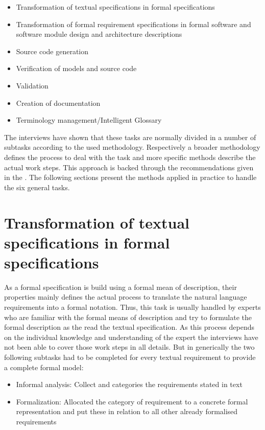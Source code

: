 \documentclass{./template/openetcs2}
\begin{document}
\vspace{-10pt}
\begin{itemize}[topsep=2pt, partopsep=2pt,itemsep=2pt,parsep=2pt]
\item Transformation of textual specifications in formal specifications
\item Transformation of formal requirement specifications in formal software and software module design and architecture descriptions
\item Source code generation
\item Verification of models and source code
\item Validation
\item Creation of documentation
\item Terminology management/Intelligent Glossary
\end{itemize}

The interviews have shown that these tasks are normally divided in a number of subtasks according to the used methodology. Respectively a broader methodology defines the  process to deal with the task and more specific methods describe the actual work steps. This approach is backed through the recommendations given in the \citeauthor{EN50128:2011}. The following sections present the methods applied in practice to handle the six general tasks.

\section{Transformation of textual specifications in formal specifications}

As a formal specification is build using a formal mean of description, their properties mainly defines the actual process to translate the natural language requirements into a formal notation. Thus, this task is usually handled by experts who are familiar with the formal means of description and try to formulate the formal description as the read the textual specification. As this process depends on the individual knowledge and understanding of the expert the interviews have not been able to cover those work steps in all details. But in generically the two following subtasks had to be completed for every textual requirement to provide a complete formal model:
\begin{itemize}
\item Informal analysis: Collect and categories the requirements stated in text
\item Formalization: Allocated the category of requirement to a concrete formal representation and put these in relation to all other already formalised requirements
\end{itemize}
\end{document}

